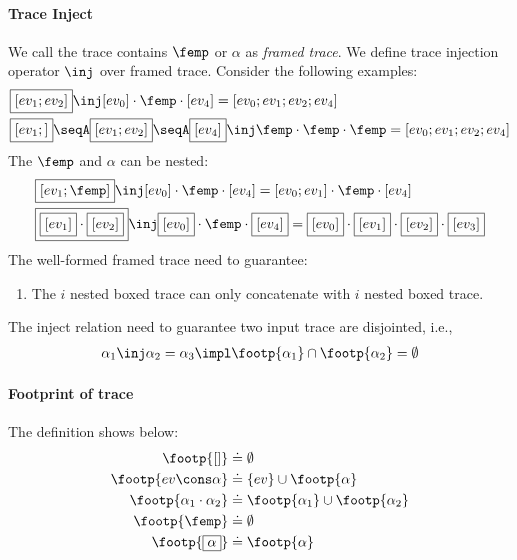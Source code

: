 \paragraph{Trace Inject} We call the trace contains $\femp$ or $\boxed{\alpha}$ as \emph{framed trace}. We define trace injection operator $\inj$ over framed trace. Consider the following examples:
\begin{align*}
    &\boxed{[ev_1;ev_2]} \inj  [ev_0] \cdot \femp \cdot [ev_4]  = [ev_0 ; ev_1;ev_2 ; ev_4]
    \\&\boxed{[ev_1;]} \seqA \boxed{[ev_1;ev_2]} \seqA \boxed{[ev_4]} \inj \femp \cdot \femp \cdot \femp = [ev_0 ; ev_1;ev_2 ; ev_4]
\end{align*}\noindent
The $\femp$ and $\boxed{\alpha}$ can be nested:
\begin{align*}
    &\boxed{[ev_1;\femp]} \inj  [ev_0] \cdot \femp \cdot [ev_4]  = [ev_0 ; ev_1] \cdot \femp \cdot [ev_4]
    \\&\boxed{\boxed{[ev_1]} \cdot \boxed{[ev_2]}} \inj \boxed{[ev_0]} \cdot \femp \cdot \boxed{[ev_4]}  = \boxed{[ev_0]} \cdot \boxed{[ev_1]} \cdot \boxed{[ev_2]} \cdot \boxed{[ev_3]}
\end{align*}\noindent
The well-formed framed trace need to guarantee:
\begin{enumerate}
    \item The $i$ nested boxed trace can only concatenate with $i$ nested boxed trace.
\end{enumerate}
The inject relation need to guarantee two input trace are disjointed, i.e., 
\begin{align*}
    \alpha_1 \inj \alpha_2 = \alpha_3 \impl \footp{\alpha_1} \cap \footp{\alpha_2} = \emptyset
\end{align*}

\paragraph{Footprint of trace} The definition shows below:
\begin{align*}
    \footp{[]} &\doteq \emptyset
    \\\footp{ev \cons \alpha } &\doteq \{ev\} \cup \footp{\alpha } 
    \\\footp{\alpha_1 \cdot \alpha_2 } &\doteq \footp{\alpha_1 } \cup \footp{\alpha_2 } 
    \\\footp{\femp } &\doteq \emptyset
    \\\footp{\boxed{\alpha} } &\doteq \footp{\alpha } 
\end{align*}


